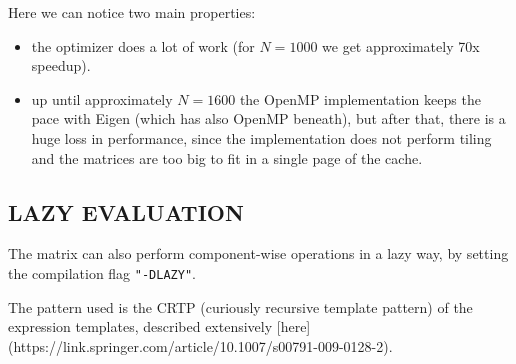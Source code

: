 \documentclass{article}
\begin{document}
\begin{figure}
    \centering

    \hfill
    \label{fig:sub4}

    \end{figure}

Here we can notice two main properties:

\begin{itemize}
    \item the optimizer does a lot of work (for \(N=1000\) we get approximately 70x speedup).
    \item up until approximately \(N=1600\) the OpenMP implementation keeps the pace with Eigen (which has also OpenMP beneath), but after that, there is a huge loss in performance, since the implementation does not perform tiling and the matrices are too big to fit in a single page of the cache.
\end{itemize}

\subsection{LAZY EVALUATION}

The matrix can also perform component-wise operations in a lazy way, by setting the compilation flag \texttt{"-DLAZY"}.

The pattern used is the CRTP (curiously recursive template pattern) of the expression templates, described extensively [here](https://link.springer.com/article/10.1007/s00791-009-0128-2).
\end{document}
